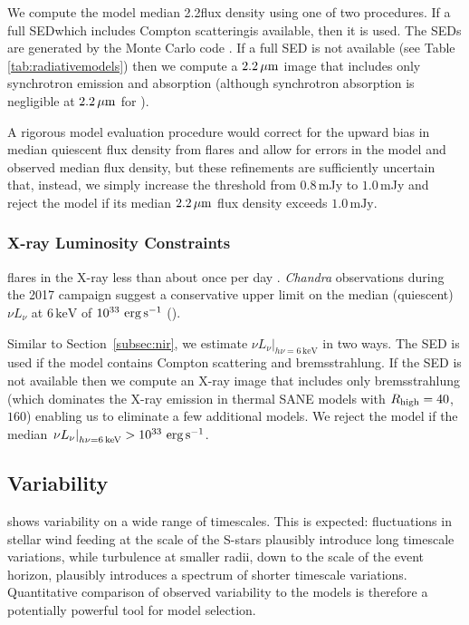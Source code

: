 We compute the model median 2.2\um flux density using one of two procedures.
If a full SED\textemdash which includes Compton scattering\textemdash is available, then it is used.
The SEDs are generated by the \grmonty Monte Carlo code \citep{2009ApJS..184..387D, Wong_2022}.
If a full SED is not available (see Table \ref{tab:radiativemodels}) then we compute a $2.2\,\mu\mathrm{m}$ image that includes only synchrotron emission and absorption (although synchrotron absorption is negligible at $2.2\,\mu\mathrm{m}$ for \sgra).

A rigorous model evaluation procedure would correct for the upward bias in median quiescent flux density from flares and allow for errors in the model and observed median flux density, but these refinements are sufficiently uncertain that, instead, we simply increase the threshold from $0.8$\,mJy to $1.0$\,mJy and reject the model if its
median $2.2\,\mu\mathrm{m}$ flux density exceeds $1.0\,\mathrm{mJy}$.

\subsubsection{X-ray Luminosity Constraints}

\sgra flares in the X-ray less than about once per day \citep[see][and references therein]{2018MNRAS.473..306Y}.
\emph{Chandra} observations during the 2017 campaign suggest a conservative upper limit on the median (quiescent) $\nu L_\nu$ at $6\,\mathrm{keV}$ of $10^{33}\,\,\mathrm{erg}\,\mathrm{s}^{-1}$ ().

Similar to Section~\ref{subsec:nir}, we estimate $\left.\nu L_\nu\right|_{h\nu=6\,\mathrm{keV}}$ in two ways.
The SED is used if the model contains Compton scattering and bremsstrahlung.
If the SED is not available then we compute an X-ray image that includes only bremsstrahlung (which dominates the X-ray emission in thermal SANE models with $R_\mathrm{high} = 40$, $160$) enabling us to eliminate a few additional models.
We reject the model if the median $\left.\nu L_\nu\right|_{h\nu=6\,\mathrm{keV}} > 10^{33}\,\,\mathrm{erg}\,\mathrm{s}^{-1}$.

\subsection{Variability}

\sgra shows variability on a wide range of timescales.
This is expected: fluctuations in stellar wind feeding at the scale of the S-stars plausibly introduce long timescale variations, while turbulence at smaller radii, down to the scale of the event horizon, plausibly introduces a spectrum of shorter timescale variations.
Quantitative comparison of observed variability to the models is therefore a potentially powerful tool for model selection.


